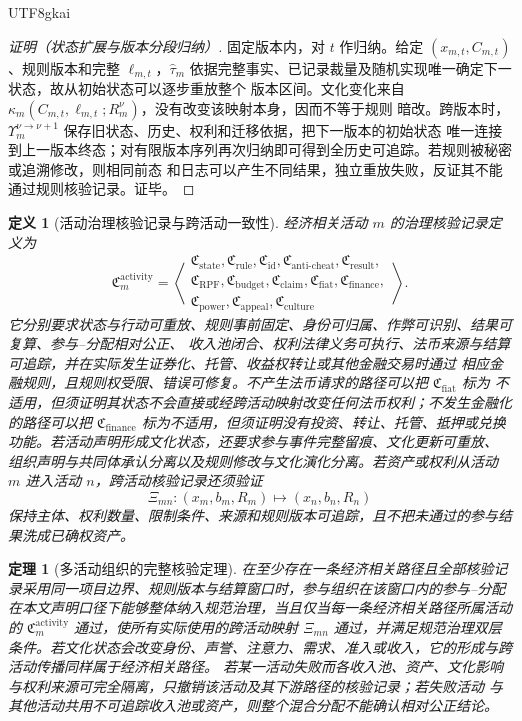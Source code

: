 \documentclass[12pt,a4paper,openany]{report}
\newtheorem{definition}{定义}[chapter]
\newtheorem{theorem}{定理}[chapter]
\begin{document}
\begin{CJK*}{UTF8}{gkai}
\begin{proof}[证明（状态扩展与版本分段归纳）]
固定版本内，对 \(t\) 作归纳。给定 \((x_{m,t},C_{m,t})\)、规则版本和完整
\(\ell_{m,t}\)，\(\widehat\tau_m\) 依据完整事实、已记录裁量及随机实现唯一确定下一状态，故从初始状态可以逐步重放整个
版本区间。文化变化来自 \(\kappa_m(C_{m,t},\ell_{m,t};R_m^\nu)\)，没有改变该映射本身，因而不等于规则
暗改。跨版本时，\(\Upsilon_m^{\nu\to\nu+1}\) 保存旧状态、历史、权利和迁移依据，把下一版本的初始状态
唯一连接到上一版本终态；对有限版本序列再次归纳即可得到全历史可追踪。若规则被秘密或追溯修改，则相同前态
和日志可以产生不同结果，独立重放失败，反证其不能通过规则核验记录。证毕。
\end{proof}

\begin{definition}[活动治理核验记录与跨活动一致性]
经济相关活动 \(m\) 的治理核验记录定义为
\[
  \mathfrak C_m^{\mathrm{activity}}
  =\left\langle
  \begin{gathered}
  \mathfrak C_{\mathrm{state}},\mathfrak C_{\mathrm{rule}},
  \mathfrak C_{\mathrm{id}},\mathfrak C_{\mathrm{anti\text{-}cheat}},
  \mathfrak C_{\mathrm{result}},\\
  \mathfrak C_{\mathrm{RPF}},\mathfrak C_{\mathrm{budget}},
  \mathfrak C_{\mathrm{claim}},\mathfrak C_{\mathrm{fiat}},
  \mathfrak C_{\mathrm{finance}},\\
  \mathfrak C_{\mathrm{power}},\mathfrak C_{\mathrm{appeal}},
  \mathfrak C_{\mathrm{culture}}
  \end{gathered}
  \right\rangle.
\]
它分别要求状态与行动可重放、规则事前固定、身份可归属、作弊可识别、结果可复算、参与--分配相对公正、
收入池闭合、权利法律义务可执行、法币来源与结算可追踪，并在实际发生证券化、托管、收益权转让或其他金融交易时通过
相应金融规则，且规则权受限、错误可修复。不产生法币请求的路径可以把 \(\mathfrak C_{\mathrm{fiat}}\) 标为
不适用，但须证明其状态不会直接或经跨活动映射改变任何法币权利；不发生金融化的路径可以把
\(\mathfrak C_{\mathrm{finance}}\) 标为不适用，但须证明没有投资、转让、托管、抵押或兑换功能。若活动声明形成文化状态，还要求参与事件完整留痕、文化更新可重放、
组织声明与共同体承认分离以及规则修改与文化演化分离。若资产或权利从活动 \(m\) 进入活动 \(n\)，跨活动核验记录还须验证
\[
  \Xi_{mn}:(x_m,b_m,R_m)\longmapsto(x_n,b_n,R_n)
\]
保持主体、权利数量、限制条件、来源和规则版本可追踪，且不把未通过的参与结果洗成已确权资产。
\end{definition}

\begin{theorem}[多活动组织的完整核验定理]
\label{thm:multi-activity-governance}
在至少存在一条经济相关路径且全部核验记录采用同一项目边界、规则版本与结算窗口时，参与组织在该窗口内的参与--分配
在本文声明口径下能够整体纳入规范治理，当且仅当每一条经济相关路径所属活动的
\(\mathfrak C_m^{\mathrm{activity}}\) 通过，使所有实际使用的跨活动映射 \(\Xi_{mn}\) 通过，并满足规范治理双层
条件。若文化状态会改变身份、声誉、注意力、需求、准入或收入，它的形成与跨活动传播同样属于经济相关路径。
若某一活动失败而各收入池、资产、文化影响与权利来源可完全隔离，只撤销该活动及其下游路径的核验记录；若失败活动
与其他活动共用不可追踪收入池或资产，则整个混合分配不能确认相对公正结论。
\end{theorem}


\end{CJK*}
\end{document}
